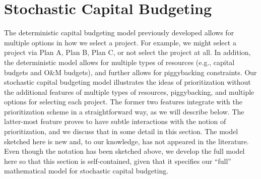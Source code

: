 \section{Stochastic Capital Budgeting}
\label{sec:StochasticCapitalBudgeting}

The deterministic capital budgeting model previously developed allows for multiple options in how
we select a project. For example, we might select a project via Plan A, Plan B, Plan C, or not
select the project at all. In addition, the deterministic model allows for multiple types of
resources (e.g., capital budgets and O\&M budgets), and further allows for piggybacking constraints.
Our stochastic capital budgeting model illustrates the ideas of prioritization without the
additional features of multiple types of resources, piggybacking, and multiple options for selecting
each project.  The former two features integrate with the prioritization scheme in a straightforward
way, as we will describe below. The latter-most feature proves to have subtle interactions with
the notion of prioritization, and we discuss that in some detail in this section. The model
sketched here is new and, to our knowledge, has not appeared in the literature. Even though the
notation has been sketched above, we develop the full model here so that this section is
self-contained, given that it specifies our “full” mathematical model for stochastic capital
budgeting.

